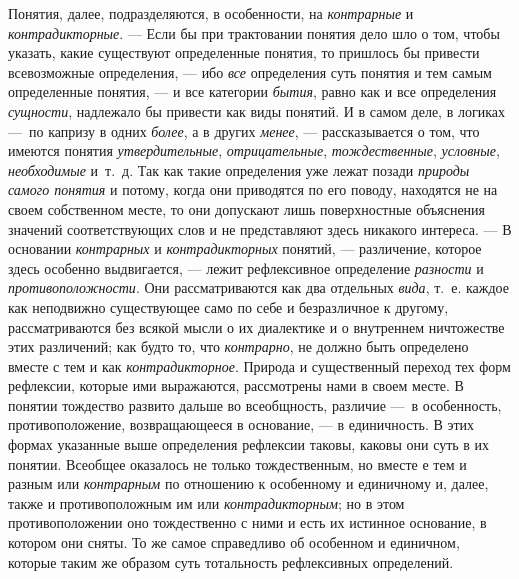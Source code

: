 \documentclass[twoside]{article}
\begin{document}
{{Понятия, далее, подразделяются, в особенности, на
{\em контрарные} и
{\em контрадикторные}. —
Если бы при трактовании понятия дело шло о том, чтобы
указать, какие существуют определенные понятия, то пришлось бы привести
всевозможные определения, — ибо
{\em все} определения
суть понятия и тем самым определенные понятия, — и все
категории {\em бытия},
равно как и все определения
{\em сущности}, надлежало
бы привести как виды понятий. И в самом деле, в логиках —~по
капризу в одних {\em более},
а в других {\em менее}, —
рассказывается о том, что имеются понятия
{\em утвердительные},
{\em отрицательные},
{\em тождественные},
{\em условные},
{\em необходимые} и~т.~д.
Так как такие определения уже лежат позади
{\em природы самого понятия}
и потому, когда они приводятся по его поводу, находятся не на
своем собственном месте, то они допускают лишь поверхностные объяснения
значений соответствующих слов и не представляют здесь никакого интереса. —
В основании
{\em контрарных} и
{\em контрадикторных}
понятий, — различение, которое здесь особенно
выдвигается, — лежит рефлексивное определение
{\em разности} и
{\em противоположности}.
Они рассматриваются как два отдельных
{\em вида}, т.~е. каждое
как неподвижно существующее само по себе и безразличное к другому,
рассматриваются без всякой мысли о их диалектике и о внутреннем ничтожестве
этих различений; как будто то, что
{\em контрарно}, не
должно быть определено вместе с тем и как
{\em контрадикторное}.
Природа и существенный переход тех форм рефлексии, которые
ими выражаются, рассмотрены нами в своем месте. В понятии тождество развито
дальше во всеобщность, различие —~в особенность,
противоположение, возвращающееся в основание, — в
единичность. В этих формах указанные выше определения рефлексии таковы,
каковы они суть в их понятии. Всеобщее оказалось не только тождественным,
но вместе е тем и разным или
{\em контрарным} по
отношению к особенному и единичному и, далее, также и противоположным им
или {\em контрадикторным};
но в этом противоположении оно тождественно с ними и есть их
истинное основание, в котором они сняты. То же самое справедливо об
особенном и единичном, которые таким же образом суть тотальность
рефлексивных определений.

}}
\end{document}
